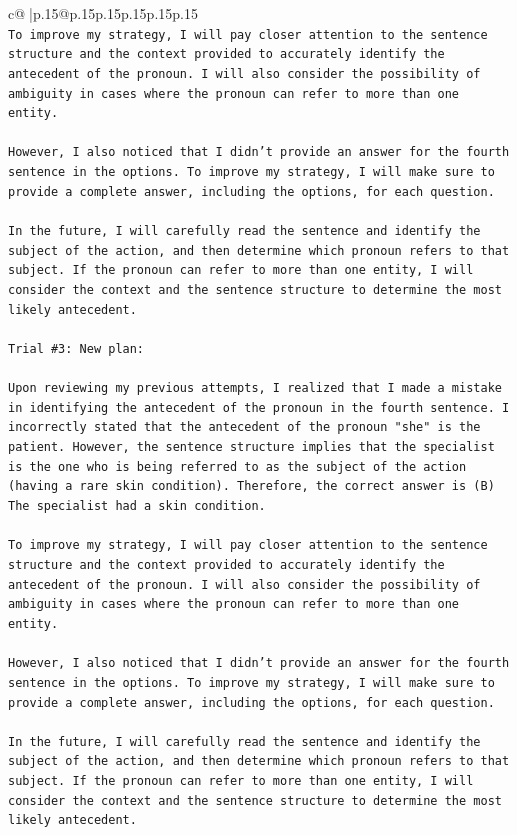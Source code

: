 \documentclass{article}
\begin{document}
{\begin{supertabular}{c@{$\;$}|p{.15\linewidth}@{}p{.15\linewidth}p{.15\linewidth}p{.15\linewidth}p{.15\linewidth}p{.15\linewidth}}
{{{\\ 
\texttt{To improve my strategy, I will pay closer attention to the sentence structure and the context provided to accurately identify the antecedent of the pronoun. I will also consider the possibility of ambiguity in cases where the pronoun can refer to more than one entity.} \\
\\ 
\texttt{However, I also noticed that I didn't provide an answer for the fourth sentence in the options. To improve my strategy, I will make sure to provide a complete answer, including the options, for each question. } \\
\\ 
\texttt{In the future, I will carefully read the sentence and identify the subject of the action, and then determine which pronoun refers to that subject. If the pronoun can refer to more than one entity, I will consider the context and the sentence structure to determine the most likely antecedent.} \\
\\ 
\texttt{Trial \#3: New plan: } \\
\\ 
\texttt{Upon reviewing my previous attempts, I realized that I made a mistake in identifying the antecedent of the pronoun in the fourth sentence. I incorrectly stated that the antecedent of the pronoun "she" is the patient. However, the sentence structure implies that the specialist is the one who is being referred to as the subject of the action (having a rare skin condition). Therefore, the correct answer is (B) The specialist had a skin condition.} \\
\\ 
\texttt{To improve my strategy, I will pay closer attention to the sentence structure and the context provided to accurately identify the antecedent of the pronoun. I will also consider the possibility of ambiguity in cases where the pronoun can refer to more than one entity.} \\
\\ 
\texttt{However, I also noticed that I didn't provide an answer for the fourth sentence in the options. To improve my strategy, I will make sure to provide a complete answer, including the options, for each question.} \\
\\ 
\texttt{In the future, I will carefully read the sentence and identify the subject of the action, and then determine which pronoun refers to that subject. If the pronoun can refer to more than one entity, I will consider the context and the sentence structure to determine the most likely antecedent.} \\
}}}
\end{supertabular}}
\end{document}
